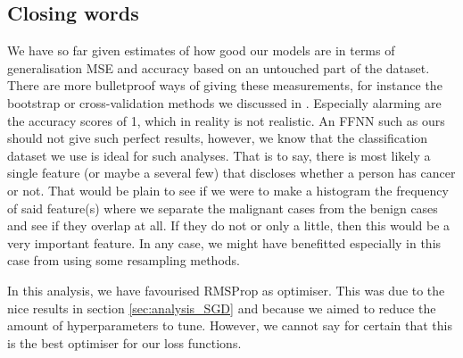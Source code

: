 \subsection{Closing words}\label{sec:analysis_closing_words}
    We have so far given estimates of how good our models are in terms of generalisation MSE and accuracy based on an untouched part of the dataset. There are more bulletproof ways of giving these measurements, for instance the bootstrap or cross-validation methods we discussed in \projectOne. Especially alarming are the accuracy scores of 1, which in reality is not realistic. An FFNN such as ours should not give such perfect results, however, we know that the classification dataset we use is ideal for such analyses. That is to say, there is most likely a single feature (or maybe a several few) that discloses whether a person has cancer or not. That would be plain to see if we were to make a histogram the frequency of said feature(s) where we separate the malignant cases from the benign cases and see if they overlap at all. If they do not or only a little, then this would be a very important feature. In any case, we might have benefitted especially in this case from using some resampling methods.

    In this analysis, we have favourised RMSProp as optimiser. This was due to the nice results in section \ref{sec:analysis_SGD} and because we aimed to reduce the amount of hyperparameters to tune. However, we cannot say for certain that this is the best optimiser for our loss functions. 